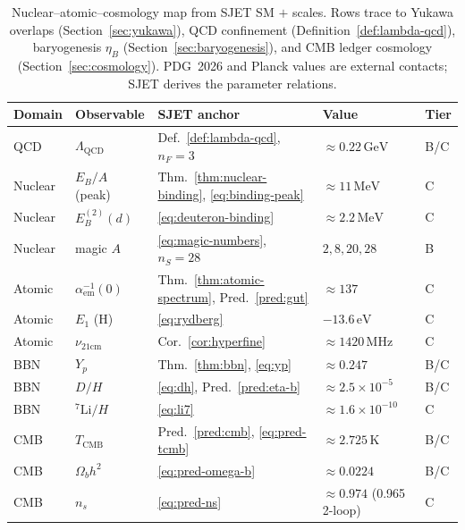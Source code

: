 \documentclass[11pt]{article}
\theoremstyle{plain}
\theoremstyle{definition}
\theoremstyle{remark}
\numberwithin{equation}{section}
\begin{document}
\begin{table}[ht]
\centering
\small
\renewcommand{\arraystretch}{1.14}
\begin{tabular}{@{}lllll@{}}
\toprule
\textbf{Domain} & \textbf{Observable} & \textbf{SJET anchor} &
\textbf{Value} & \textbf{Tier} \\
\midrule
QCD &
  $\Lambda_{\mathrm{QCD}}$ &
  Def.~\ref{def:lambda-qcd}, $n_F=3$ &
  $\approx 0.22\,\mathrm{GeV}$ &
  B/C \\
Nuclear &
  $E_B/A$ (peak) &
  Thm.~\ref{thm:nuclear-binding}, \eqref{eq:binding-peak} &
  $\approx 11\,\mathrm{MeV}$ &
  C \\
Nuclear &
  $E_B^{(2)}(d)$ &
  \eqref{eq:deuteron-binding} &
  $\approx 2.2\,\mathrm{MeV}$ &
  C \\
Nuclear &
  magic $A$ &
  \eqref{eq:magic-numbers}, $n_S=28$ &
  $2,8,20,28$ &
  B \\
Atomic &
  $\alpha_{\mathrm{em}}^{-1}(0)$ &
  Thm.~\ref{thm:atomic-spectrum}, Pred.~\ref{pred:gut} &
  $\approx 137$ &
  C \\
Atomic &
  $E_1$ (H) &
  \eqref{eq:rydberg} &
  $-13.6\,\mathrm{eV}$ &
  C \\
Atomic &
  $\nu_{21\mathrm{cm}}$ &
  Cor.~\ref{cor:hyperfine} &
  $\approx 1420\,\mathrm{MHz}$ &
  C \\
BBN &
  $Y_p$ &
  Thm.~\ref{thm:bbn}, \eqref{eq:yp} &
  $\approx 0.247$ &
  B/C \\
BBN &
  $D/H$ &
  \eqref{eq:dh}, Pred.~\ref{pred:eta-b} &
  $\approx 2.5\times 10^{-5}$ &
  B/C \\
BBN &
  ${}^7\mathrm{Li}/H$ &
  \eqref{eq:li7} &
  $\approx 1.6\times 10^{-10}$ &
  C \\
CMB &
  $T_{\mathrm{CMB}}$ &
  Pred.~\ref{pred:cmb}, \eqref{eq:pred-tcmb} &
  $\approx 2.725\,\mathrm{K}$ &
  B/C \\
CMB &
  $\Omega_b h^2$ &
  \eqref{eq:pred-omega-b} &
  $\approx 0.0224$ &
  B/C \\
CMB &
  $n_s$ &
  \eqref{eq:pred-ns} &
  $\approx 0.974$ (0.965 2-loop) &
  C \\
\bottomrule
\end{tabular}
\caption{Nuclear--atomic--cosmology map from SJET SM $+$ scales. Rows trace
to Yukawa overlaps (Section~\ref{sec:yukawa}), QCD confinement
(Definition~\ref{def:lambda-qcd}), baryogenesis $\eta_B$
(Section~\ref{sec:baryogenesis}), and CMB ledger cosmology
(Section~\ref{sec:cosmology}). PDG~2026 and Planck values are external
contacts; SJET derives the parameter relations.}
\label{tab:nuclear-cosmo-map}
\end{table}
\end{document}
